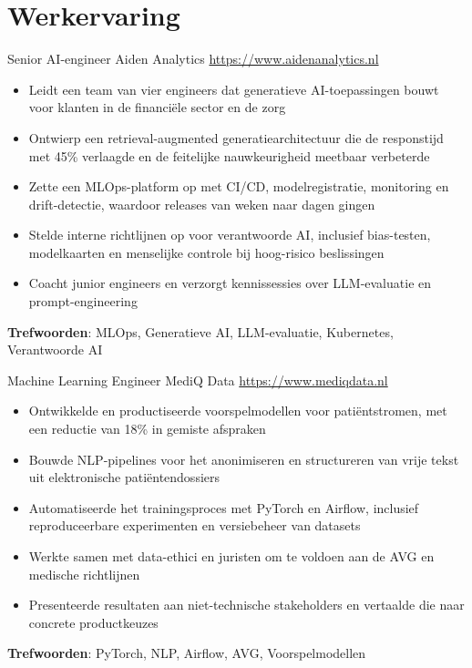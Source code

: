 \documentclass[a4paper, serif, 10pt]{moderncv}
\begin{document}
\section{Werkervaring}

        {Senior AI-engineer}
        {Aiden Analytics}
        {\url{https://www.aidenanalytics.nl}}
        {}
        {\begin{itemize}
\item Leidt een team van vier engineers dat generatieve AI-toepassingen bouwt voor klanten in de financiële sector en de zorg
\item Ontwierp een retrieval-augmented generatiearchitectuur die de responstijd met 45\% verlaagde en de feitelijke nauwkeurigheid meetbaar verbeterde
\item Zette een MLOps-platform op met CI/CD, modelregistratie, monitoring en drift-detectie, waardoor releases van weken naar dagen gingen
\item Stelde interne richtlijnen op voor verantwoorde AI, inclusief bias-testen, modelkaarten en menselijke controle bij hoog-risico beslissingen
\item Coacht junior engineers en verzorgt kennissessies over LLM-evaluatie en prompt-engineering
\end{itemize}
\textbf{Trefwoorden}: MLOps, Generatieve AI, LLM-evaluatie, Kubernetes, Verantwoorde AI}

        {Machine Learning Engineer}
        {MediQ Data}
        {\url{https://www.mediqdata.nl}}
        {}
        {\begin{itemize}
\item Ontwikkelde en productiseerde voorspelmodellen voor patiëntstromen, met een reductie van 18\% in gemiste afspraken
\item Bouwde NLP-pipelines voor het anonimiseren en structureren van vrije tekst uit elektronische patiëntendossiers
\item Automatiseerde het trainingsproces met PyTorch en Airflow, inclusief reproduceerbare experimenten en versiebeheer van datasets
\item Werkte samen met data-ethici en juristen om te voldoen aan de AVG en medische richtlijnen
\item Presenteerde resultaten aan niet-technische stakeholders en vertaalde die naar concrete productkeuzes
\end{itemize}
\textbf{Trefwoorden}: PyTorch, NLP, Airflow, AVG, Voorspelmodellen}
\end{document}
